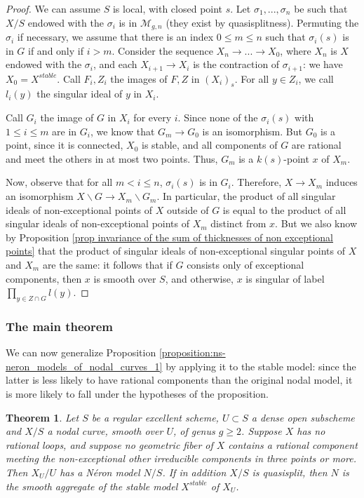 \documentclass[a4paper,12pt]{amsart} %
\numberwithin{equation}{subsection}
\theoremstyle{definition}
\theoremstyle{plain}%
\newtheorem{theorem}[definition]{Theorem}
\theoremstyle{remark}
\begin{document}
\begin{proof}
We can assume $S$ is local, with closed point $s$. Let $\sigma_1,...,\sigma_n$ be such that $X/S$ endowed with the $\sigma_i$ is in $\mathcal{M}_{g,n}$ (they exist by quasisplitness). Permuting the $\sigma_i$ if necessary, we assume that there is an index $0\leq m\leq n$ such that $\sigma_i(s)$ is in $G$ if and only if $i> m$. Consider the sequence $X_n\to...\to X_0$, where $X_n$ is $X$ endowed with the $\sigma_i$, and each $X_{i+1}\to X_i$ is the contraction of $\sigma_{i+1}$: we have $X_0=X^{stable}$. Call $F_i,Z_i$ the images of $F,Z$ in $(X_i)_s$. For all $y\in Z_i$, we call $l_i(y)$ the singular ideal of $y$ in $X_i$.

Call $G_i$ the image of $G$ in $X_i$ for every $i$. Since none of the $\sigma_i(s)$ with $1\leq i\leq m$ are in $G_i$, we know that $G_m\to G_0$ is an isomorphism. But $G_0$ is a point, since it is connected, $X_0$ is stable, and all components of $G$ are rational and meet the others in at most two points. Thus, $G_m$ is a $k(s)$-point $x$ of $X_m$.

Now, observe that for all $m<i\leq n$, $\sigma_i(s)$ is in $G_i$. Therefore, $X\to X_m$ induces an isomorphism $X\backslash G\to X_m\backslash G_m$. In particular, the product of all singular ideals of non-exceptional points of $X$ outside of $G$ is equal to the product of all singular ideals of non-exceptional points of $X_m$ distinct from $x$. But we also know by Proposition \ref{prop invariance of the sum of thicknesses of non exceptional points} that the product of singular ideals of non-exceptional singular points of $X$ and $X_m$ are the same: it follows that if $G$ consists only of exceptional components, then $x$ is smooth over $S$, and otherwise, $x$ is singular of label $\prod\limits_{y\in Z\cap G}l(y)$.
\end{proof}

\subsubsection{The main theorem}

We can now generalize Proposition \ref{proposition:ns-neron_models_of_nodal_curves_1} by applying it to the stable model: since the latter is less likely to have rational components than the original nodal model, it is more likely to fall under the hypotheses of the proposition.

\begin{theorem}\label{Theorem:ns_neron_models_of_nodal_curves}
Let $S$ be a regular excellent scheme, $U\subset S$ a dense open subscheme and $X/S$ a nodal curve, smooth over $U$, of genus $g\geq 2$. Suppose $X$ has no rational loops, and suppose no geometric fiber of $X$ contains a rational component meeting the non-exceptional other irreducible components in three points or more. Then $X_U/U$ has a N\'eron model $N/S$. If in addition $X/S$ is quasisplit, then $N$ is the smooth aggregate of the stable model $X^{stable}$ of $X_U$.
\end{theorem}
\end{document}
